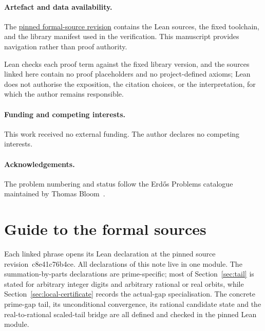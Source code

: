 \documentclass[11pt]{article}
\renewcommand{\commitshort}{c8e41c76b4ce}
\begin{document}
\paragraph{Artefact and data availability.} The
\href{\sourceurl}{pinned formal-source revision} contains the Lean sources, the
fixed toolchain, and the library manifest used in the verification.  This
manuscript provides navigation rather than proof authority.

Lean checks each proof term against the fixed library
version, and the sources linked here contain no proof placeholders and no
project-defined axioms; Lean does not authorise the exposition, the citation
choices, or the interpretation, for which the author remains responsible.

\paragraph{Funding and competing interests.} This work received no external
funding.  The author declares no competing interests.

\paragraph{Acknowledgements.} The problem numbering and status follow the
Erd\H{o}s Problems catalogue maintained by Thomas Bloom~\cite{erdosproblems}.

\appendix
\section{Guide to the formal sources}\label{app:index}

Each linked phrase opens its Lean declaration at the pinned source
revision~\commitshort.  All declarations of this note live in one module.  The
summation-by-parts declarations are prime-specific; most of
Section~\ref{sec:tail} is stated for arbitrary integer digits and arbitrary
rational or real orbits, while Section~\ref{sec:local-certificate} records the
actual-gap specialisation.  The concrete prime-gap tail, its unconditional
convergence, its rational candidate state and the real-to-rational scaled-tail
bridge are all defined and checked in the pinned Lean module.

\iffalse
\end{document}
